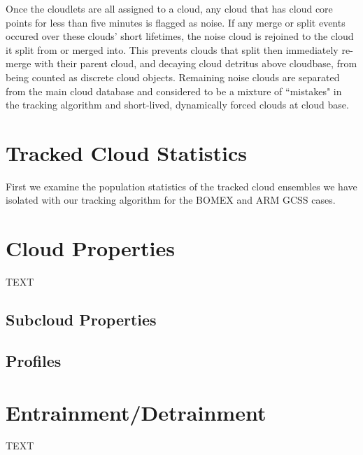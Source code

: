 \documentclass[acp]{copernicus}
\begin{document}
Once the cloudlets are all assigned to a cloud, any cloud that has cloud core points for less than five minutes is flagged as noise.  If any merge or split 
events occured over these clouds' short lifetimes, the noise cloud is rejoined 
to the cloud it split from or merged into.  This prevents clouds that split
then immediately re-merge with their parent cloud, and decaying cloud detritus 
above cloudbase, from being counted as discrete cloud objects.  Remaining 
noise clouds are separated from the main cloud database and considered to be a mixture of ``mistakes" in the tracking algorithm and short-lived, dynamically forced clouds at cloud base.


\section{Tracked Cloud Statistics}

First we examine the population statistics of the tracked cloud ensembles we 
have isolated with our tracking algorithm for the BOMEX and ARM GCSS cases.



\section{Cloud Properties}
TEXT

\subsection{Subcloud Properties}

\subsection{Profiles}



\section{Entrainment/Detrainment}



\conclusions
TEXT
\end{document}
